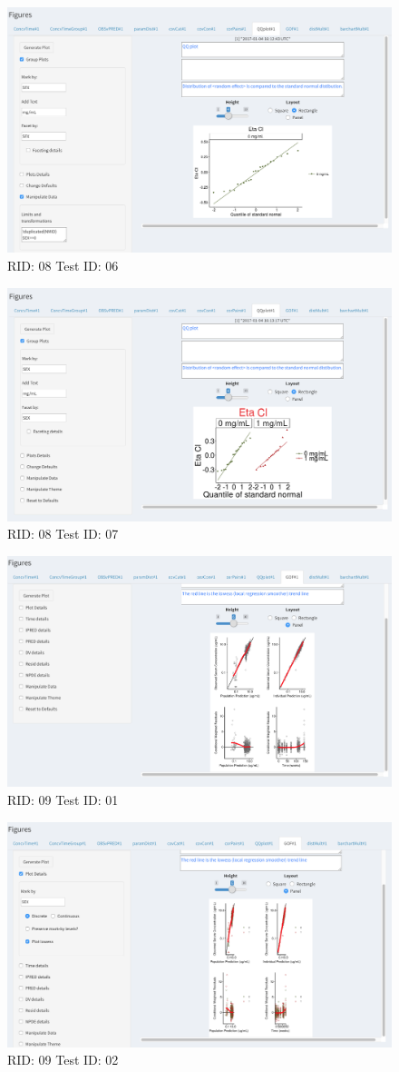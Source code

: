 \begin{figure}[H]
\includegraphics[width=.8\textwidth]{screencaps/08-06-1.png}
\caption{RID: 08 Test ID: 06}
\end{figure}
\begin{figure}[H]
\includegraphics[width=.8\textwidth]{screencaps/08-07-1.png}
\caption{RID: 08 Test ID: 07}
\end{figure}
\begin{figure}[H]
\includegraphics[width=.8\textwidth]{screencaps/09-01-1.png}
\caption{RID: 09 Test ID: 01}
\end{figure}
\begin{figure}[H]
\includegraphics[width=.8\textwidth]{screencaps/09-02-1.png}
\caption{RID: 09 Test ID: 02}
\end{figure}
